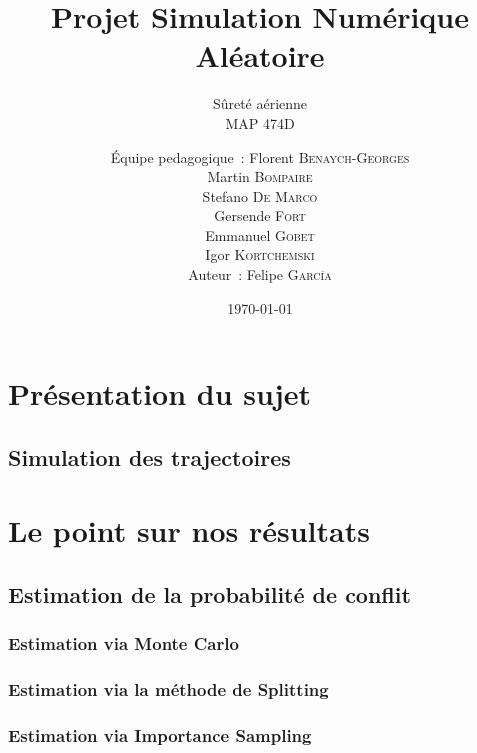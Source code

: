 \documentclass[a4paper, 12pt,twoside]{article}
\title{Projet Simulation Numérique Aléatoire}
\subtitle{Sûreté aérienne \\ MAP 474D}
\author{Équipe pedagogique~: Florent  \textsc{Benaych-Georges} \\
		Martin \textsc{Bompaire} \\
		Stefano \textsc{De Marco} \\
		Gersende \textsc{Fort} \\
		Emmanuel \textsc{Gobet} \\
		Igor \textsc{Kortchemski} \\
		\vspace{2ex}
		Auteur~: Felipe \textsc{García} \\
		}
\date\today
\begin{document}
    \maketitle
    \renewcommand{\baselinestretch}{1.1}
    \setlength{\parskip}{0.5em}
    \tableofcontents
    \clearpage

    \section{Présentation du sujet}
	
	\subsection{Simulation des trajectoires} %
	\label{sub:simulation_des_trajectoires}
	
	
    \clearpage
    
    \section{Le point sur nos résultats}
    
    \subsection{Estimation de la probabilité de conflit}
	
	\subsubsection{Estimation via Monte Carlo} %
	\label{ssub:estimation_via_monte_carlo}
	
    
	\subsubsection{Estimation via la méthode de Splitting} %
	\label{ssub:estimation_via_la_methode_de_splitting}
	
	
	\subsubsection{Estimation via Importance Sampling} %
	\label{ssub:estimation_via_importance_sampling}
	
\end{document}
